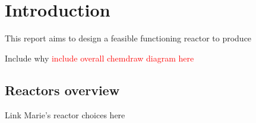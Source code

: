 \section{Introduction}
This report aims to design a feasible functioning reactor to produce 

Include why 
\textcolor{red}{include overall chemdraw diagram here}
\subsection{Reactors overview}
Link Marie's reactor choices here


